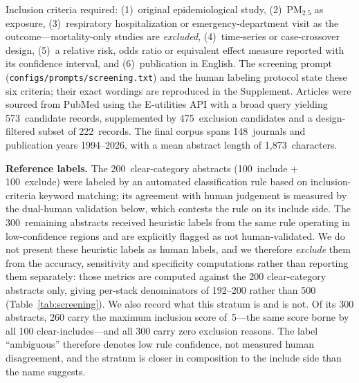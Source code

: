 \documentclass[preprint,review,12pt,authoryear]{elsarticle}
\begin{document}
\noindent Inclusion criteria required: (1)~original epidemiological study, (2)~PM$_{2.5}$ as exposure, (3)~respiratory hospitalization or emergency-department visit as the outcome---mortality-only studies are \emph{excluded}, (4)~time-series or case-crossover design, (5)~a relative risk, odds ratio or equivalent effect measure reported with its confidence interval, and (6)~publication in English.
The screening prompt (\texttt{configs/prompts/screening.txt}) and the human labeling protocol state these six criteria; their exact wordings are reproduced in the Supplement.
Articles were sourced from PubMed using the E-utilities API with a broad query yielding 573~candidate records, supplemented by 475~exclusion candidates and a design-filtered subset of 222~records.
The final corpus spans 148~journals and publication years 1994--2026, with a mean abstract length of 1,873~characters.

\textbf{Reference labels.}
The 200~clear-category abstracts (100~include + 100~exclude) were labeled by an automated classification rule based on inclusion-criteria keyword matching; its agreement with human judgement is measured by the dual-human validation below, which contests the rule on its include side.
The 300~remaining abstracts received heuristic labels from the same rule operating in low-confidence regions and are explicitly flagged as not human-validated.
We do not present these heuristic labels as human labels, and we therefore \emph{exclude} them from the accuracy, sensitivity and specificity computations rather than reporting them separately: those metrics are computed against the 200 clear-category abstracts only, giving per-stack denominators of 192--200 rather than 500 (Table~\ref{tab:screening}).
We also record what this stratum is and is not. Of its 300 abstracts, 260 carry the maximum inclusion score of~5---the same score borne by all 100 clear-includes---and all 300 carry zero exclusion reasons. The label ``ambiguous'' therefore denotes low rule confidence, not measured human disagreement, and the stratum is closer in composition to the include side than the name suggests.
\end{document}
